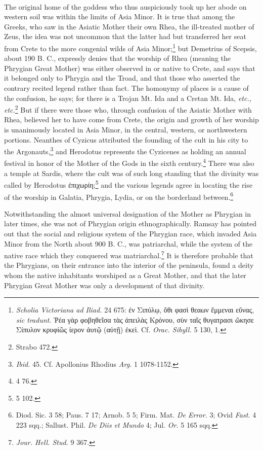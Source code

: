 \documentclass[a4paper, 11pt, oneside, polutonikogreek, english]{article}
\begin{document}
\paragraph{}
The original home of the goddess who thus auspiciously took up her abode on western soil was within the limits of Asia Minor. It is true that among the Greeks, who saw in the Asiatic Mother their own Rhea, the ill-treated mother of Zeus, the idea was not uncommon that the latter had but transferred her seat from Crete to the more congenial wilds of Asia Minor;\footnote{\emph{Scholia Victoriana ad Iliad.} 24 675: ἐν Σιπύλῳ, ὅθι φασὶ θεαων ἔμμεναι εὔνας, \emph{sic tradunt}. Ῥέα γὰρ φοβηθεῖσα τὰς ἀπειλὰς Κρόνου, σὺν ταῖς θυγατρασι ὤκησε Σίπυλον κρυφίῶς ίερον ἀυτῷ (αὐτῇ) ἐκεὶ. Cf. \emph{Orac. Sibyll.} 5 130, 1.} but Demetrius of Scepsis, about 190 B. C., expressly denies that the worship of Rhea (meaning the Phrygian Great Mother) was either observed in or native to Crete, and says that it belonged only to Phrygia and the Troad, and that those who asserted the contrary recited legend rather than fact. The homonymy of places is a cause of the confusion, he says; for there is a Trojan Mt. Ida and a Cretan Mt. Ida, \emph{etc., etc.}\footnote{Strabo 472.} But if there were those who, through confusion of the Asiatic Mother with Rhea, believed her to have come from Crete, the origin and growth of her worship is unanimously located in Asia Minor, in the central, western, or northwestern portions. Neanthes of Cyzicus attributed the founding of the cult in his city to the Argonauts,\footnote{\emph{Ibid.} 45. Cf. Apollonius Rhodius \emph{Arg.} 1 1078-1152.} and Herodotus represents the Cyzicenes as holding an annual festival in honor of the Mother of the Gods in the sixth century.\footnote{4 76.} There was also a temple at Sardis, where the cult was of such long standing that the divinity was called by Herodotus ἐπιχωρίη;\footnote{5 102.} and the various legends agree in locating the rise of the worship in Galatia, Phrygia, Lydia, or on the borderland between.\footnote{Diod. Sic. 3 58; Paus. 7 17; Arnob. 5 5; Firm. Mat. \emph{De Error.} 3; Ovid \emph{Fast.} 4 223 sqq.; Sallust. Phil. \emph{De Diis et Mundo} 4; Jul. \emph{Or.} 5 165 sqq.}

Notwithstanding the almost universal designation of the Mother as Phrygian in later times, she was not of Phrygian origin ethnographically. Ramsay has pointed out that the social and religious system of the Phrygian race, which invaded Asia Minor from the North about 900 B. C., was patriarchal, while the system of the native race which they conquered was matriarchal.\footnote{\emph{Jour. Hell. Stud.} 9 367.} It is therefore probable that the Phrygians, on their entrance into the interior of the peninsula, found a deity whom the native inhabitants worshiped as a Great Mother, and that the later Phrygian Great Mother was only a development of that divinity.
\end{document}
